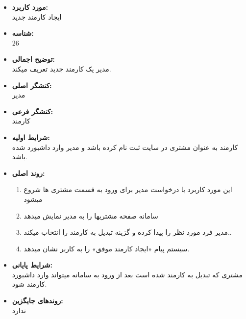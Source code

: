 \documentclass{article}
\begin{document}
\begin{itemize}
\item \textbf{مورد کاربرد:}\\
ایجاد کارمند جدید
\item \textbf{شناسه:}\\
26
\item \textbf{توضیح اجمالی:}\\
مدیر یک کارمند جدید تعریف میکند.
\item \textbf{کنشگر اصلی:}\\
مدیر
\item \textbf{کنشگر فرعی:}\\
کارمند
\item \textbf{شرایط اولیه:}\\
کارمند به عنوان مشتری در سایت ثبت نام کرده باشد و مدیر وارد داشبورد شده باشد.
\item \textbf{روند اصلی:}\\
\begin{enumerate}
\item  این مورد کاربرد با درخواست مدیر برای ورود به قسمت مشتری ها شروع میشود
\item سامانه صفحه مشتریها را به مدیر نمایش میدهد
\item مدیر فرد مورد نظر را پیدا کرده و گزینه تبدیل به کارمند را انتخاب میکند..
\item  سیستم پیام «ایجاد کارمند موفق» را به کاربر نشان میدهد.
\end{enumerate}
\item \textbf{شرایط پایانی:}\\ 
مشتری که تبدیل به کارمند شده است بعد از ورود به سامانه میتواند وارد داشبورد کارمند شود.
\item \textbf{روندهای جایگزین:}\\
ندارد
\end{itemize}
\noindent\makebox[\linewidth]{\rule{\paperwidth}{0.4pt}}
\end{document}
